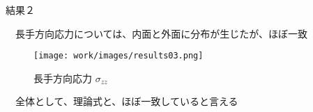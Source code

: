 \begin{frame}{結果２}
 
　長手方向応力については、内面と外面に分布が生じたが、ほぼ一致
\begin{figure}[htbp]
\centering
  \begin{minipage}{0.49\columnwidth}
     \centering
     \texttt{[image: work/images/results03.png]}
     \caption{長手方向応力
       \begin{math}
         σ_{zz}
       \end{math}
     }
  \end{minipage}
%
  \begin{minipage}{0.49\columnwidth}
  \end{minipage}
\end{figure}

　全体として、理論式と、ほぼ一致していると言える

\end{frame}
